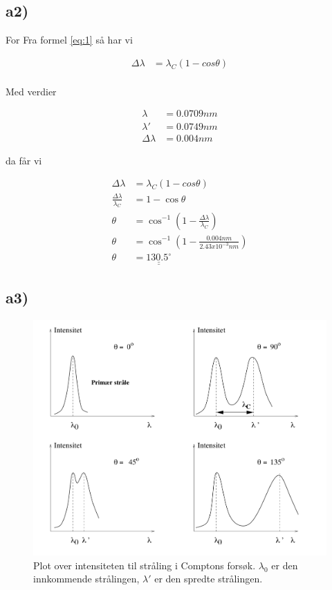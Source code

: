 \documentclass[norsk,a4paper,12pt]{article}
\begin{document}
\subsection*{a2)}

For Fra formel \eqref{eq:1} så har vi 

\begin{align*}
\Delta\lambda &= \lambda_C(1-cos\theta)\\
\end{align*}

Med verdier

\begin{align*}
\lambda &= 0.0709 nm\\
\lambda' &= 0.0749 nm\\
\Delta\lambda &= 0.004 nm
\end{align*}

da får vi

\begin{align*}
\Delta\lambda &= \lambda_C(1-cos\theta)\\
\frac{\Delta\lambda}{\lambda_C} &=  1- \cos \theta\\
\theta &= \cos^{-1}(1- \frac{\Delta\lambda}{\lambda_C})\\
\theta &= \cos^{-1}(1- \frac{0.004nm}{2.43x10^{-3}nm})\\
\theta &= \underline{\underline{130.5^\circ}}
\end{align*}

\subsection*{a3)}


\begin{figure}[h]
\includegraphics[scale=0.4]{intensitetcompton}
\caption{Plot over intensiteten til stråling i Comptons forsøk. $\lambda_0$ er den innkommende strålingen, $\lambda'$ er den spredte strålingen.}
\label{fig:intensitetcompton}
\end{figure}
\end{document}
